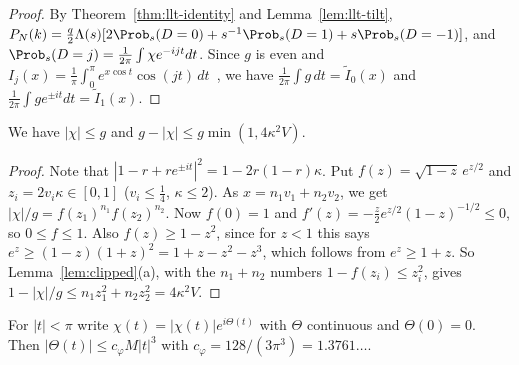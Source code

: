 \begin{proof}
By Theorem~\ref{thm:llt-identity} and Lemma~\ref{lem:llt-tilt},
$P_N(k)=\frac q2\Lambda(s)[2\Prob_s(D=0)+s^{-1}\Prob_s(D=1)+s\Prob_s(D=-1)]$, and
$\Prob_s(D=j)=\frac1{2\pi}\int\chi e^{-ijt}dt$. Since $g$ is even and
$I_j(x)=\frac1\pi\int_0^\pi e^{x\cos t}\cos(jt)\,dt$~\cite[Eq.~10.32.3]{dlmf}, we have
$\frac1{2\pi}\int g\,dt=\tilde I_0(x)$ and $\frac1{2\pi}\int ge^{\pm it}dt=\tilde I_1(x)$.
\end{proof}

\begin{lemma}[modulus]\label{lem:llt-modulus}
We have $|\chi|\le g$ and $g-|\chi|\le g\min(1,4\kappa^2V)$.
\end{lemma}

\begin{proof}
Note that $|1-r+re^{\pm it}|^2=1-2r(1-r)\kappa$. Put $f(z)=\sqrt{1-z}\,e^{z/2}$ and
$z_i=2v_i\kappa\in[0,1]$ ($v_i\le\frac14$, $\kappa\le2$). As $x=n_1v_1+n_2v_2$, we get
$|\chi|/g=f(z_1)^{n_1}f(z_2)^{n_2}$. Now $f(0)=1$ and $f'(z)=-\frac z2e^{z/2}(1-z)^{-1/2}\le0$, so
$0\le f\le1$. Also $f(z)\ge1-z^2$, since for $z<1$ this says $e^z\ge(1-z)(1+z)^2=1+z-z^2-z^3$,
which follows from $e^z\ge1+z$. So Lemma~\ref{lem:clipped}(a), with the $n_1+n_2$ numbers
$1-f(z_i)\le z_i^2$, gives $1-|\chi|/g\le n_1z_1^2+n_2z_2^2=4\kappa^2V$.
\end{proof}

\begin{lemma}[phase]\label{lem:llt-phase}
For $|t|<\pi$ write $\chi(t)=|\chi(t)|e^{i\Theta(t)}$ with $\Theta$ continuous and $\Theta(0)=0$.
Then $|\Theta(t)|\le c_\varphi M|t|^3$ with $c_\varphi=128/(3\pi^3)=1.3761\ldots$.
\end{lemma}

